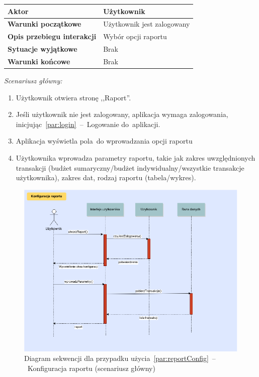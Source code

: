 \begin{longtable}{|p{5cm}|p{7cm}|}
  \hline \textbf{Aktor} & Użytkownik \\
  \hline \textbf{Warunki początkowe} & Użytkownik jest zalogowany \\
  \hline \textbf{Opis przebiegu interakcji} & Wybór opcji raportu \\
  \hline \textbf{Sytuacje wyjątkowe} & Brak \\
  \hline \textbf{Warunki końcowe} & Brak \\
  \hline
\end{longtable}

\noindent \textit{Scenariusz główny:}
\begin{enumerate}
  \item Użytkownik otwiera stronę ,,Raport''.
  \item Jeśli użytkownik nie jest zalogowany, aplikacja wymaga zalogowania, inicjując~\ref{par:login}~--~Logowanie do~aplikacji.
  \item Aplikacja wyświetla pola~do wprowadzania opcji raportu
  \item Użytkownika wprowadza parametry raportu, takie jak zakres uwzględnionych transakcji (budżet sumaryczny/budżet indywidualny/wszystkie transakcje użytkownika), zakres dat, rodzaj raportu (tabela/wykres).
\end{enumerate}

\begin{figure}[H]
  \includegraphics[width=\textwidth]{images/raport_konfig.png}
  \caption{Diagram sekwencji dla przypadku użycia~\ref{par:reportConfig}~--~Konfiguracja raportu (scenariusz główny)}
\end{figure}

